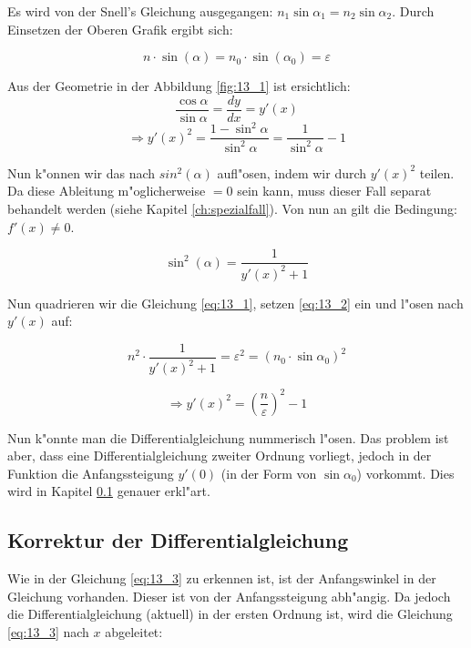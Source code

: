 Es wird von der Snell's Gleichung ausgegangen: $n_1 \sin \alpha_1 = n_2 \sin \alpha_2$.
Durch Einsetzen der Oberen Grafik ergibt sich:

\begin{equation} \label{eq:13_1}
  n \cdot \sin(\alpha) = n_0 \cdot \sin(\alpha_0) = \varepsilon
\end{equation}

Aus der Geometrie in der Abbildung \ref{fig:13_1} ist ersichtlich:
$$\frac{\cos \alpha}{\sin \alpha} = \frac{dy}{dx} = y'(x)$$
$$\Rightarrow y'(x)^2 = \frac{1 - \sin^2 \alpha}{\sin^2 \alpha} = \frac{1}{\sin^2 \alpha} - 1$$

Nun k"onnen wir das nach $sin^2(\alpha)$ aufl"osen, indem wir durch $y'(x)^2$ teilen. 
Da diese Ableitung m"oglicherweise $=0$ sein kann, muss dieser Fall separat behandelt werden (siehe Kapitel \ref{ch:spezialfall}). 
Von nun an gilt die Bedingung: $f'(x) \neq 0$.

\begin{equation} \label{eq:13_2}
\sin^2 (\alpha) = \frac{1}{y'(x)^2 + 1}
\end{equation}

Nun quadrieren wir die Gleichung \ref{eq:13_1}, setzen \ref{eq:13_2} ein und l"osen nach $y'(x)$ auf:

\begin{equation} \label{eq:13_3}
n^2 \cdot \frac{1}{y'(x)^2 + 1} = \varepsilon^2 = (n_0 \cdot \sin \alpha_0)^2
\end{equation}

\begin{equation} \label{eq:13_4}
\Rightarrow y'(x)^2 = \left( \frac{n}{\varepsilon} \right)^2 - 1
\end{equation}

Nun k"onnte man die Differentialgleichung nummerisch l"osen. 
Das problem ist aber, dass eine Differentialgleichung zweiter Ordnung vorliegt, jedoch in der Funktion die Anfangssteigung $y'(0)$ (in der Form von $\sin \alpha_0$) vorkommt. 
Dies wird in Kapitel \ref{ch:korrektur} genauer erkl"art.

\subsection{Korrektur der Differentialgleichung} \label{ch:korrektur}

Wie in der Gleichung \ref{eq:13_3} zu erkennen ist, ist der Anfangswinkel in der Gleichung vorhanden. 
Dieser ist von der Anfangssteigung abh"angig. 
Da jedoch die Differentialgleichung (aktuell) in der ersten Ordnung ist, wird die Gleichung \ref{eq:13_3} nach $x$ abgeleitet:


